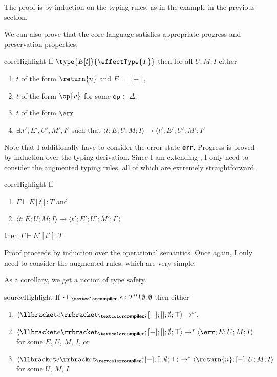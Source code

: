 The proof is by induction on the typing rules, as in the example in the previous section.  

We can also prove that the core language \coreLang{} satisfies appropriate progress and preservation properties. 

\begin{theorem}[Progress]{coreHighlight} 
If $\type{E[t]}{\effectType{T}}$ then for all $U, M, I$ either 
\begin{enumerate}
\item $t$ of the form $\return{n}$ and $E = [-]$,
\item $t$ of the form $\op{v}$ for some $\textsf{op} \in \Delta$,
\item $t$ of the form $\err$
\item $\exists. t', E', U', M', I'$ such that $\langle t; E; U; M; I \rangle \rightarrow \langle t';E';U';M';I'$
\end{enumerate}
\end{theorem}
Note that I additionally have to consider the error state \textbf{\texttt{err}}. Progress is proved by induction over the typing derivation. Since I am extending \efflang{}, I only need to consider the augmented typing rules, all of which are extremely straightforward.

\begin{theorem}{coreHighlight}
If 
\begin{enumerate} 
  \item $\Gamma \vdash E[t]: T$ and 
  \item $\langle t; E; U; M; I \rangle \to \langle t'; E'; U'; M'; I' \rangle$ 
  \end{enumerate}
  then $\Gamma \vdash E'[t']: T$ 
\end{theorem}
Proof proceeds by induction over the operational semantics. Once again, I only need to consider the augmented rules, which are very simple. 

As a corollary, we get a notion of type safety.
\begin{corollary}{sourceHighlight}\label{cor:core-type-safety}
  If $\ctypejudge[\cdot]{e}{T^0 \, ! \, \emptyset;\emptyset}$ then either
  \begin{enumerate}
    \item $\langle \elaborate{e}_{\compilemode{}}; [-]; []
    ; \emptyset; \top \rangle \to^{\omega}$,
    \item $\langle \elaborate{e}_{\compilemode{}}; [-]; []; \emptyset; \top \rangle \to^{*} \langle \err; E; U; M; I \rangle$ for some $E$, $U$, $M$, $I$, or 
    \item $\langle \elaborate{e}_{\compilemode{}}; [-]; []; \emptyset; \top \rangle \to^{*} \langle \return{n}; [-]; U; M; I \rangle$ for some $U$, $M$, $I$
  \end{enumerate} 
\end{corollary}

